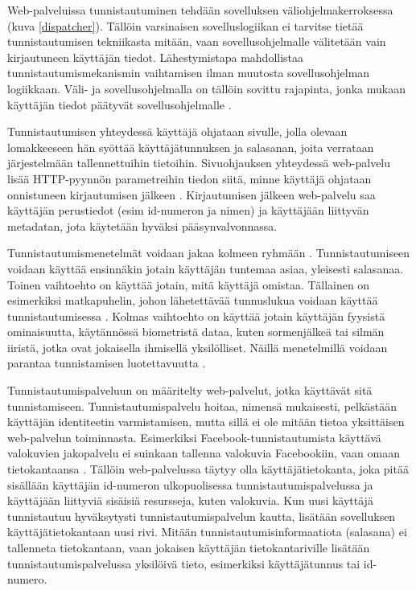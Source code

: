 Web-palveluissa tunnistautuminen tehdään sovelluksen väliohjelmakerroksessa (kuva \ref{dispatcher}). Tällöin varsinaisen sovelluslogiikan ei tarvitse tietää tunnistautumisen tekniikasta mitään, vaan sovellusohjelmalle välitetään vain kirjautuneen käyttäjän tiedot. Lähestymistapa mahdollistaa tunnistautumismekanismin vaihtamisen ilman muutosta sovellusohjelman logiikkaan. Väli- ja sovellusohjelmalla on tällöin sovittu rajapinta, jonka mukaan käyttäjän tiedot päätyvät sovellusohjelmalle \cite{django}.

Tunnistautumisen yhteydessä käyttäjä ohjataan sivulle, jolla olevaan lomakkeeseen hän syöttää käyttäjätunnuksen ja salasanan, joita verrataan järjestelmään tallennettuihin tietoihin. Sivuohjauksen yhteydessä web-palvelu lisää HTTP-pyynnön parametreihin tiedon siitä, minne käyttäjä ohjataan onnistuneen kirjautumisen jälkeen \cite{oauth2_0}. Kirjautumisen jälkeen web-palvelu saa käyttäjän perustiedot (esim id-numeron ja nimen) ja käyttäjään liittyvän metadatan, jota käytetään hyväksi pääsynvalvonnassa.

Tunnistautumismenetelmät voidaan jakaa kolmeen ryhmään \cite{nisti}. Tunnistautumiseen voidaan käyttää ensinnäkin jotain käyttäjän tuntemaa asiaa, yleisesti salasanaa. Toinen vaihtoehto on käyttää jotain, mitä käyttäjä omistaa. Tällainen on esimerkiksi matkapuhelin, johon lähetettävää tunnuslukua voidaan käyttää tunnistautumisessa \cite{5336918}. Kolmas vaihtoehto on käyttää jotain käyttäjän fyysistä ominaisuutta, käytännössä biometristä dataa, kuten sormenjälkeä tai silmän iiristä, jotka ovat jokaisella ihmisellä yksilölliset. Näillä menetelmillä voidaan parantaa tunnistamisen luotettavuutta \cite{nisti}.

Tunnistautumispalveluun on määritelty web-palvelut, jotka käyttävät sitä tunnistamiseen. Tunnistautumispalvelu hoitaa, nimensä mukaisesti, pelkästään käyttäjän identiteetin varmistamisen, mutta sillä ei ole mitään tietoa yksittäisen web-palvelun toiminnasta. Esimerkiksi Facebook-tunnistautumista käyttävä valokuvien jakopalvelu ei suinkaan tallenna valokuvia Facebookiin, vaan omaan tietokantaansa \cite{web_resources}. Tällöin web-palvelussa täytyy olla käyttäjätietokanta, joka pitää sisällään käyttäjän id-numeron ulkopuolisessa tunnistautumispalvelussa ja käyttäjään liittyviä sisäisiä resursseja, kuten valokuvia. Kun uusi käyttäjä tunnistautuu hyväksytysti tunnistautumispalvelun kautta, lisätään sovelluksen käyttäjätietokantaan uusi rivi. Mitään tunnistautumisinformaatiota (salasana) ei tallenneta tietokantaan, vaan jokaisen käyttäjän tietokantariville lisätään tunnistautumispalvelussa yksilöivä tieto, esimerkiksi käyttäjätunnus tai id-numero.